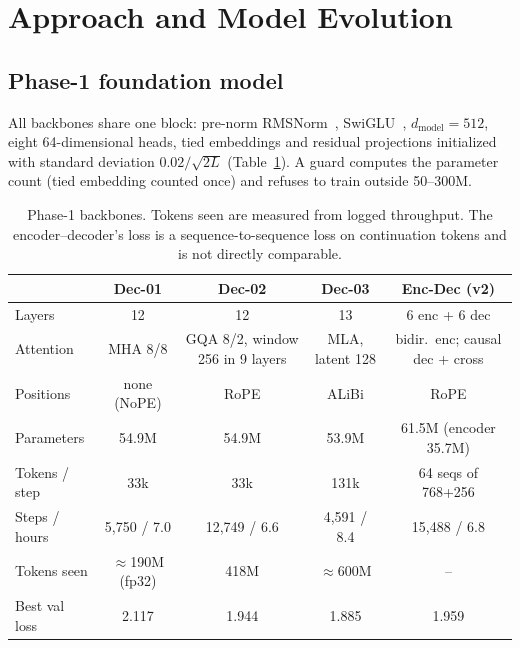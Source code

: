 \documentclass[11pt, oneside]{article}
\begin{document}
\section{Approach and Model Evolution}
\subsection{Phase-1 foundation model}
All backbones share one block: pre-norm RMSNorm~\cite{zhang2019rmsnorm}, SwiGLU~\cite{shazeer2020glu}, $d_\text{model}=512$, eight 64-dimensional heads, tied embeddings and residual projections initialized with standard deviation $0.02/\sqrt{2L}$ (Table~\ref{tab:arch}). A guard computes the parameter count (tied embedding counted once) and refuses to train outside 50--300M.

\begin{table}[t]
\centering
\footnotesize
\caption{Phase-1 backbones. Tokens seen are measured from logged throughput. The encoder--decoder's loss is a sequence-to-sequence loss on continuation tokens and is not directly comparable.}
\label{tab:arch}
\setlength{\tabcolsep}{3.4pt}
\begin{tabular}{lcccc}
\toprule
 & Dec-01 & Dec-02 & Dec-03 & Enc-Dec (v2) \\
\midrule
Layers & 12 & 12 & 13 & 6 enc + 6 dec \\
Attention & MHA 8/8 & GQA 8/2, window 256 in 9 layers & MLA, latent 128 & bidir.\ enc; causal dec + cross \\
Positions & none (NoPE) & RoPE & ALiBi & RoPE \\
Parameters & 54.9M & 54.9M & 53.9M & 61.5M (encoder 35.7M) \\
Tokens / step & 33k & 33k & 131k & 64 seqs of 768+256 \\
Steps / hours & 5,750 / 7.0 & 12,749 / 6.6 & 4,591 / 8.4 & 15,488 / 6.8 \\
Tokens seen & $\approx$190M (fp32) & 418M & $\approx$600M & -- \\
Best val loss & 2.117 & 1.944 & 1.885 & 1.959 \\
\bottomrule
\end{tabular}
\end{table}
\end{document}
